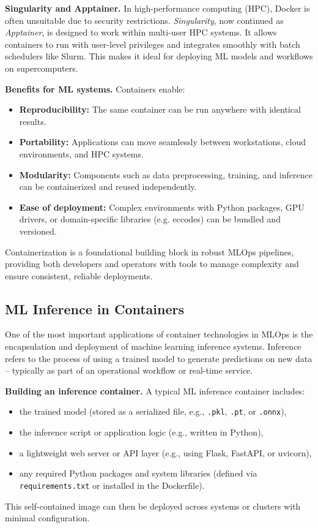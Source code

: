 {\bf Singularity and Apptainer.} In high-performance computing (HPC), Docker is often unsuitable due to security restrictions. \emph{Singularity}, now continued as \emph{Apptainer}, is designed to work within multi-user HPC systems. It allows containers to run with user-level privileges and integrates smoothly with batch schedulers like Slurm. This makes it ideal for deploying ML models and workflows on supercomputers.

{\bf Benefits for ML systems.} Containers enable:
\begin{itemize}
	\item \textbf{Reproducibility:} The same container can be run anywhere with identical results.
	\item \textbf{Portability:} Applications can move seamlessly between workstations, cloud environments, and HPC systems.
	\item \textbf{Modularity:} Components such as data preprocessing, training, and inference can be containerized and reused independently.
	\item \textbf{Ease of deployment:} Complex environments with Python packages, GPU drivers, or domain-specific libraries (e.g. eccodes) can be bundled and versioned.
\end{itemize}

Containerization is a foundational building block in robust MLOps pipelines, providing both developers and operators with tools to manage complexity and ensure consistent, reliable deployments.


%
\subsection{ML Inference in Containers}

One of the most important applications of container technologies in MLOps is the encapsulation and deployment of machine learning inference systems. Inference refers to the process of using a trained model to generate predictions on new data -- typically as part of an operational workflow or real-time service.

{\bf Building an inference container.} A typical ML inference container includes:
\begin{itemize}
	\item the trained model (stored as a serialized file, e.g., \texttt{.pkl}, \texttt{.pt}, or \texttt{.onnx}),
	\item the inference script or application logic (e.g., written in Python),
	\item a lightweight web server or API layer (e.g., using Flask, FastAPI, or uvicorn),
	\item any required Python packages and system libraries (defined via \texttt{requirements.txt} or installed in the Dockerfile).
\end{itemize}
This self-contained image can then be deployed across systems or clusters with minimal configuration.

